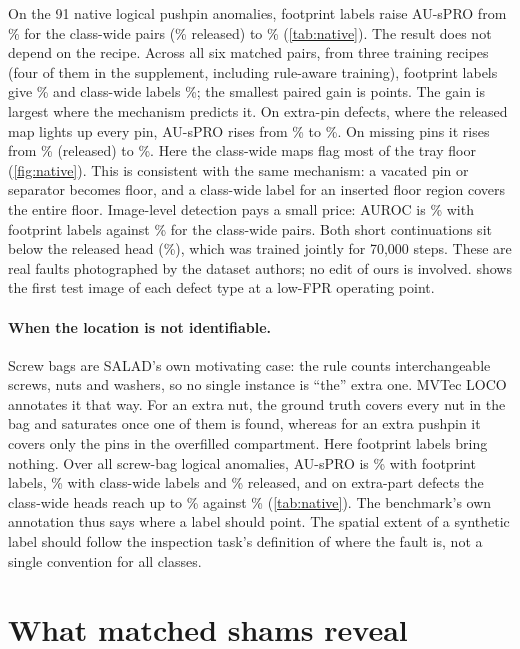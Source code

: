 On the 91 native logical pushpin anomalies, footprint labels raise AU-sPRO from \natPPcw\% for the class-wide pairs (\natPPrel\% released) to \natPPfp\% (\cref{tab:native}). The result does not depend on the recipe. Across all six matched pairs, from three training recipes (four of them in the supplement, including rule-aware training), footprint labels give \sixFP\% and class-wide labels \sixCW\%; the smallest paired gain is \sixMinGain{} points. The gain is largest where the mechanism predicts it. On extra-pin defects, where the released map lights up every pin, AU-sPRO rises from \natAddCW\% to \natAddFP\%. On missing pins it rises from \natMissRel\% (released) to \natMissFP\%. Here the class-wide maps flag most of the tray floor (\cref{fig:native}). This is consistent with the same mechanism: a vacated pin or separator becomes floor, and a class-wide label for an inserted floor region covers the entire floor. Image-level detection pays a small price: AUROC is \aucFP\% with footprint labels against \aucCW\% for the class-wide pairs. Both short continuations sit below the released head (\aucRel\%), which was trained jointly for 70{,}000 steps. These are real faults photographed by the dataset authors; no edit of ours is involved.  shows the first test image of each defect type at a low-FPR operating point.

\paragraph{When the location is not identifiable.} Screw bags are SALAD's own motivating case: the rule counts interchangeable screws, nuts and washers, so no single instance is ``the'' extra one. MVTec LOCO annotates it that way. For an extra nut, the ground truth covers every nut in the bag and saturates once one of them is found, whereas for an extra pushpin it covers only the pins in the overfilled compartment. Here footprint labels bring nothing. Over all screw-bag logical anomalies, AU-sPRO is \natSBfp\% with footprint labels, \natSBcw\% with class-wide labels and \natSBrel\% released, and on extra-part defects the class-wide heads reach up to \natSBaddCW\% against \natSBaddFP\% (\cref{tab:native}). The benchmark's own annotation thus says where a label should point. The spatial extent of a synthetic label should follow the inspection task's definition of where the fault is, not a single convention for all classes.

\section{What matched shams reveal}
\label{sec:system}
\begin{table}[t]
\centering
\caption{\textbf{Full SALAD on matched pushpin trays.} Alarms out of 138 on the extracted path. Native: logical AUROC on 91 native logical anomalies and 138 good trays. The validation cutoff is the published operating point. The normal-test cutoff is refit on one fixed half of the unedited test trays and applied to the other half, in both directions.}
\label{tab:system}
\footnotesize\setlength{\tabcolsep}{1.7pt}

\end{table}

